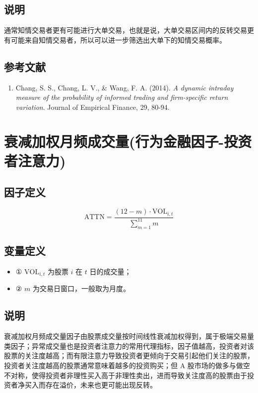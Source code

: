 \documentclass{article}
\begin{document}
\subsection{说明}
通常知情交易者更有可能进行大单交易，也就是说，大单交易区间内的反转交易更有可能来自知情交易者，所以可以进一步筛选出大单下的知情交易概率。

\subsection{参考文献}
\begin{enumerate}
    \item Chang, S. S., Chang, L. V., \& Wang, F. A. (2014). \textit{A dynamic intraday measure of the probability of informed trading and firm-specific return variation}. Journal of Empirical Finance, 29, 80-94.
\end{enumerate}

\section{衰减加权月频成交量(行为金融因子-投资者注意力)}

\subsection{因子定义}
\begin{equation}
    \mathrm{ATTN} = \frac{(12 - m) \cdot \mathrm{VOL}_{i, t}}{\sum_{m=1}^{11} m}
\end{equation}

\subsection{变量定义}
\begin{itemize}
    \item ① \( \mathrm{VOL}_{i, t} \) 为股票 \( i \) 在 \( t \) 日的成交量；
    \item ② \( m \) 为交易日窗口，一般取为月度。
\end{itemize}

\subsection{说明}
衰减加权月频成交量因子由股票成交量按时间线性衰减加权得到，属于极端交易量类因子；异常成交量也是投资者注意力的常用代理指标，因子值越高，投资者对该股票的关注度越高；而有限注意力导致投资者更倾向于交易引起他们关注的股票，投资者关注度越高的股票通常意味着越多的投资购买；但 A 股市场的做多与做空不对称，使得投资者非理性买入高于非理性卖出，进而导致关注度高的股票由于投资者净买入而存在溢价，未来也更可能出现反转。
\end{document}
